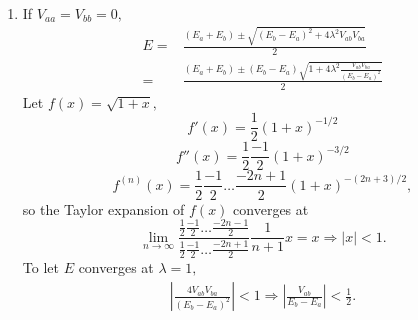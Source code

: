 \begin{enumerate}
\begin{align*}
    \end{align*}
     \begin{align*}
         E^1_- =& \begin{pmatrix}
        1 & 0
    \end{pmatrix}
    \begin{pmatrix}
        V_{aa} & V_{ab}\\
        V_{ba} & V_{bb}
    \end{pmatrix}
    \begin{pmatrix}
        1 \\ 0
    \end{pmatrix}\\
    =&\begin{pmatrix}
        1 & 0
    \end{pmatrix}
    \begin{pmatrix}
        V_{aa}\\V_{ba}
    \end{pmatrix} = V_{aa}
    \end{align*}

    By equation7.15
    \begin{align*}
        E_+^2 = \frac{|V_{ab}|^2}{E_b-E_a}
    \end{align*}
    \begin{align*}
        E_-^2 = \frac{|V_{ba}|^2}{E_a-E_b}
    \end{align*}
    \item 
    If $V_{aa}=V_{bb}=0,$
    \begin{align*}
        E =& \frac{(E_a+E_b)\pm\sqrt{(E_b-E_a)^2+4\lambda^2V_{ab}V_{ba}}}{2}\\
        =&\frac{(E_a+E_b)\pm
        (E_b-E_a)\sqrt{1+4\lambda^2
        \frac{V_{ab}V_{ba}}{(E_b-E_a)^2}}}{2}
    \end{align*}
    Let $f(x)=\sqrt{1+x},$
    $$
    f'(x)=\frac{1}{2}(1+x)^{-1/2}
    $$
    $$
    f''(x) = \frac{1}{2}\frac{-1}{2}(1+x)^{-3/2}
    $$
    $$
    f^{(n)}(x)
    =\frac{1}{2}\frac{-1}{2}\dots\frac{-2n+1}{2}(1+x)^{-(2n+3)/2},
    $$
    so the Taylor expansion of $f(x)$ converges at 
    $$
    \lim_{n\to\infty}\frac{\frac{1}{2}\frac{-1}{2}\dots\frac{-2n-1}{2}}
    {\frac{1}{2}\frac{-1}{2}\dots\frac{-2n+1}{2}}
    \frac{1}{n+1}x=x\Rightarrow |x|<1.
    $$
    To let $E$ converges at $\lambda=1,$
    \begin{align*}
        \left|\frac{4 V_{ab}V_{ba}}{(E_b-E_a)^2}\right|<1
        \Rightarrow
        \left|\frac{V_{ab}}{E_b-E_a}\right|<\frac{1}{2}.
    \end{align*}
    
    
\end{enumerate}

